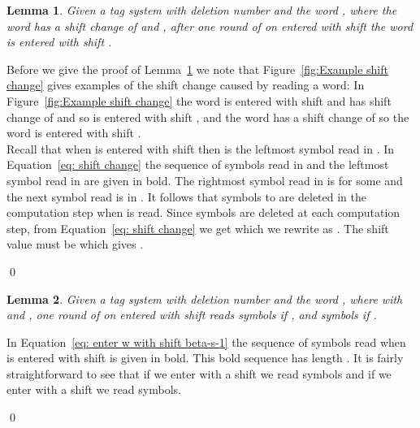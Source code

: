 \documentclass[11pt]{article} \usepackage{amsfonts,amsmath,amssymb,amsthm}
\renewenvironment{proof}{{\bfseries\noindent Proof.}}{\qed\vspace{3.5ex}}
\newtheorem{lemma}{Lemma}
\begin{document}
\begin{lemma}\label{lem:shiftChange}
Given a tag system  with deletion number  and the word , where the word  has a shift change of  and , after one round of  on  entered with shift  the word  is entered with shift .
\end{lemma}
Before we give the proof of Lemma~\ref{lem:shiftChange} we note that Figure~\ref{fig:Example shift change} gives examples of the shift change caused by reading a word: In Figure~\ref{fig:Example shift change} the word  is entered with shift  and has shift change of  and so  is entered with shift , and the word  has a shift change of  so the word  is entered with shift .\\

\begin{proof}
Recall that when  is entered with shift  then  is the leftmost symbol read in . In Equation~\eqref{eq: shift change} the sequence of symbols read in  and the leftmost symbol read in  are given in bold. The rightmost symbol read in  is  for some  and the next symbol read is  in . It follows that symbols  to  are deleted in the computation step when  is read. Since  symbols are deleted at each computation step, from Equation~\eqref{eq: shift change} we get  which we rewrite as . The shift value  must be  which gives .

\end{proof}

\begin{lemma}\label{lem:read upper or lower bound number of symbols}
Given a tag system  with deletion number  and the word , where  with  and , one round of  on  entered with shift  reads  symbols if , and  symbols if .
\end{lemma}
\begin{proof}
In Equation~\eqref{eq: enter w with shift beta-s-1} the sequence of symbols read when  is entered with shift  is given in bold. This bold sequence has length .
It is fairly straightforward to see that if we enter  with a shift  we read  symbols and if we enter  with a shift  we read  symbols.

\end{proof}

 
\end{document}
